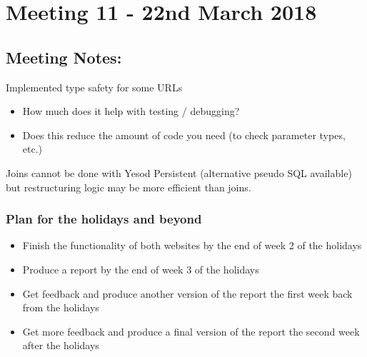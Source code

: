 \section{Meeting 11 - 22nd March 2018}

\subsection{Meeting Notes:}
Implemented type safety for some URLs

\begin{itemize}
  \item{How much does it help with testing / debugging?}
  \item{Does this reduce the amount of code you need (to check parameter types, etc.)}
\end{itemize}

Joins cannot be done with Yesod Persistent (alternative pseudo SQL available) but restructuring
logic may be more efficient than joins.

\subsubsection{Plan for the holidays and beyond}
\begin{itemize}
  \item{Finish the functionality of both websites by the end of week 2 of the holidays}
  \item{Produce a report by the end of week 3 of the holidays}
  \item{Get feedback and produce another version of the report the first week back from the holidays}
  \item{Get more feedback and produce a final version of the report the second week after the holidays}
\end{itemize}
